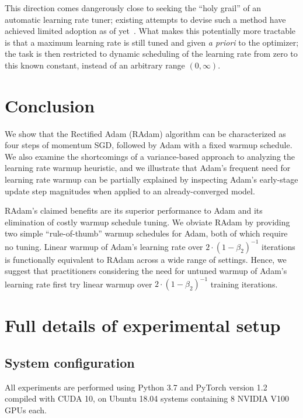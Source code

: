 {This direction comes dangerously close to seeking the ``holy grail'' of an automatic learning rate tuner; existing attempts to devise such a method have achieved limited adoption as of yet~\citep{li2017sme, zhang2017yellowfin, baydin2018hgd}. What makes this potentially more tractable is that a maximum learning rate is still tuned and given \emph{a priori} to the optimizer; the task is then restricted to dynamic scheduling of the learning rate from zero to this known constant, instead of an arbitrary range $(0, \infty)$.\section{Conclusion}
\label{sec:conclusion}

We show that the Rectified Adam (RAdam) algorithm can be characterized as four steps of momentum SGD, followed by Adam with a fixed warmup schedule. We also examine the shortcomings of a variance-based approach to analyzing the learning rate warmup heuristic, and we illustrate that Adam's frequent need for learning rate warmup can be partially explained by inspecting Adam's early-stage update step magnitudes when applied to an already-converged model.

RAdam's claimed benefits are its superior performance to Adam and its elimination of costly warmup schedule tuning. We obviate RAdam by providing two simple ``rule-of-thumb'' warmup schedules for Adam, both of which require no tuning. Linear warmup of Adam's learning rate over $2 \cdot (1 - \beta_2)^{-1}$ iterations is functionally equivalent to RAdam across a wide range of settings. Hence, we suggest that practitioners considering the need for untuned warmup of Adam's learning rate first try linear warmup over $2 \cdot (1 - \beta_2)^{-1}$ training iterations.
  \newpage
    
  \onecolumn
  \appendix
  
  \newpage
\section{Full details of experimental setup}
\label{apx:training-details}

\subsection{System configuration}

All experiments are performed using Python 3.7 and PyTorch version 1.2~\citep{paszke2017pytorch} compiled with CUDA 10, on Ubuntu 18.04 systems containing 8 NVIDIA V100 GPUs each.

}
